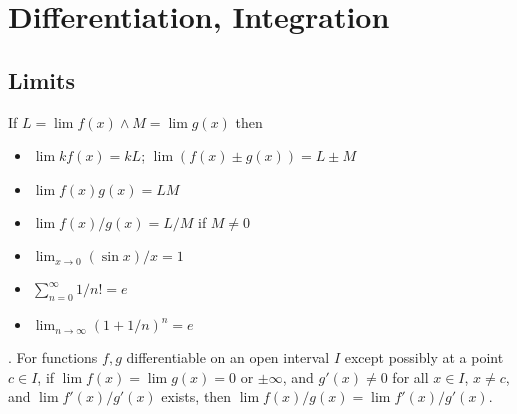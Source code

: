 \documentclass{slnotes}
\begin{document}
\chapter{Differentiation, Integration}
\section{Limits}
If \(L = \lim f(x) \land M = \lim g(x)\) then \begin{itemize}
\item \(\lim kf(x) = kL\); \(\lim (f(x) \pm g(x)) = L \pm M\)
\item \(\lim f(x)g(x) = LM\)
\item \(\lim f(x)/g(x) = L/M\) if \(M \neq 0\)
\item \(\lim_{x\to0} (\sin x)/x = 1\)
\item \(\sum^\infty_{n=0} 1/n! = e\)
\item \(\lim_{n\to\infty} (1+1/n)^n = e\)
\end{itemize}

. For functions \(f, g\) differentiable on an open interval \(I\) except possibly at a point \(c \in I\), if \(\lim f(x) = \lim g(x) = 0\) or \(\pm\infty\), and \(g'(x) \neq 0\) for all \(x \in I\), \(x \neq c\), and \(\lim f'(x)/g'(x)\) exists, then \(\lim f(x)/g(x) = \lim f'(x)/g'(x)\).
\end{document}
